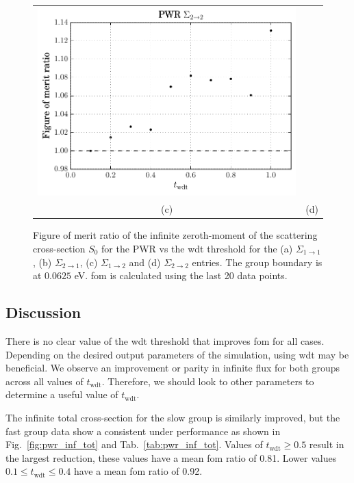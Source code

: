 \begin{figure}[hbtp]
\begin{tabular}{cc}
  \includegraphics[scale=0.6]{images/results/pwr_inf_sp0_grp_4} \\
    (c) & (d)
  \end{tabular}
  \caption[Figure of merit ratio of the infinite zeroth-moment of the
  scattering cross-section for the PWR]{Figure of merit ratio of the
    infinite zeroth-moment of the scattering cross-section $S_0$ for
    the PWR vs the \gls{wdt} threshold for the (a) $\Sigma_{1 \to
      1}$, (b) $\Sigma_{2 \to 1}$, (c) $\Sigma_{1 \to 2}$ and (d)
    $\Sigma_{2 \to 2}$ entries. The group boundary is at $0.0625$ eV. \gls{fom} is
    calculated using the last 20 data points.}
  \label{fig:pwr_inf_sp0}
\end{figure}
\newpage
\subsection{Discussion}
\label{sec:pwr_discussion}

There is no clear value of the \gls{wdt} threshold that improves
\gls{fom} for all cases. Depending on the desired output parameters of
the simulation, using \gls{wdt} may be beneficial. We observe an
improvement or parity in infinite flux for both groups across all values of
$t_\mathrm{wdt}$. Therefore, we should look to other parameters to
determine a useful value of $t_{\mathrm{wdt}}$.

The infinite total cross-section for the slow group is similarly
improved, but the fast group data show a consistent under performance
as shown in Fig.~\ref{fig:pwr_inf_tot} and
Tab.~\ref{tab:pwr_inf_tot}. Values of $t_{\mathrm{wdt}} \geq 0.5$
result in the largest reduction, these values have a mean \gls{fom}
ratio of 0.81. Lower values $0.1 \leq t_{\mathrm{wdt}} \leq 0.4$ have
a mean \gls{fom} ratio of 0.92.

